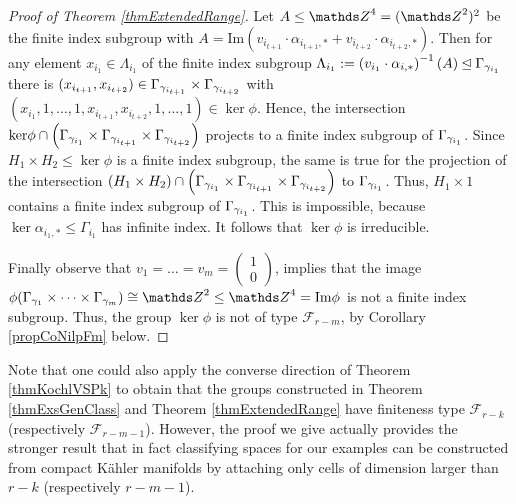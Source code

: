 \begin{proof}[Proof of Theorem \ref{thmExtendedRange}]
Let $A\leq \ZZ^4 = (\ZZ^2)^2$ be the finite index subgroup with $A= \mathrm{Im} \left( v_{i_{t+1}}\cdot\alpha_{i_{t+1},\ast} + v_{i_{t+2}}\cdot \alpha_{i_{t+2},\ast}\right)$. Then for any element $x_{i_1}\in \Lambda_{i_1}$ of the finite index subgroup $\Lambda_{i_1}:=\left( v_{i_1} \cdot \alpha_{i,\ast}\right)^{-1}(A)\unlhd \Gamma_{\gamma_{i_1}}$ there is $(x_{i_{t+1}},x_{i_{t+2}})\in \Gamma_{\gamma_{i_{t+1}}}\times \Gamma_{\gamma_{i_{t+2}}}$ with $(x_{i_1},1,\dots,1,x_{i_{t+1}},x_{i_{t+2}},1,\dots,1)\in \ker \phi$. Hence, the intersection ${\rm{ker}} \phi \cap \left(\Gamma_{\gamma_{i_1}}\times \Gamma_{\gamma_{i_{t+1}}}\times \Gamma_{\gamma_{i_{t+2}}}\right)$ projects to a finite index subgroup of $\Gamma_{\gamma_{i_1}}$. Since $H_1\times H_2\leq \ker \phi$ is a finite index subgroup, the same is true for the projection of the intersection $\left(H_1\times H_2\right) \cap \left(\Gamma_{\gamma_{i_1}}\times \Gamma_{\gamma_{i_{t+1}}}\times \Gamma_{\gamma_{i_{t+2}}}\right)$ to $\Gamma_{\gamma_{i_1}}$. Thus, $H_1\times 1 $ contains a finite index subgroup of $\Gamma_{\gamma_{i_1}}$. This is impossible, because $\ker \alpha_{i_1,\ast}\leq \Gamma_{i_1}$ has infinite index. It follows that $\ker \phi$ is irreducible.

Finally observe that $v_1=\dots=v_m=\left(\begin{array}{c} 1\\ 0 \end{array}\right)$, implies that the image $\phi(\Gamma_{\g_1}\times \dots \times \Gamma_{\g_m})\cong \ZZ^2 \leq \ZZ^4=\mathrm{Im} \phi$ is not a finite index subgroup. Thus, the group $\ker \phi$ is not of type $\mathcal{F}_{r-m}$, by Corollary \ref{propCoNilpFm} below.
\end{proof}

\begin{remark}
 Note that one could also apply the converse direction of Theorem \ref{thmKochlVSPk} to obtain that the groups constructed in Theorem \ref{thmExsGenClass} and Theorem \ref{thmExtendedRange} have finiteness type $\mathcal{F}_{r-k}$ (respectively $\mathcal{F}_{r-m-1}$). However, the proof we give actually provides the stronger result that in fact classifying spaces for our examples can be constructed from compact K\"ahler manifolds by attaching only cells of dimension larger than $r-k$ (respectively $r-m-1$).
\end{remark}

